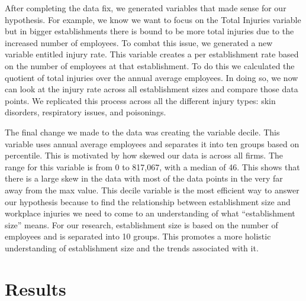 \documentclass[12pt]{article}
\begin{document}
After completing the data fix, we generated variables that made sense for our hypothesis. For example, we know we want to focus on the Total Injuries variable but in bigger establishments there is bound to be more total injuries due to the increased number of employees. To combat this issue, we generated a new variable entitled injury rate. This variable creates a per establishment rate based on the number of employees at that establishment. To do this we calculated the quotient of total injuries over the annual average employees. In doing so, we now can look at the injury rate across all establishment sizes and compare those data points. We replicated this process across all the different injury types: skin disorders, respiratory issues, and poisonings. 

The final change we made to the data was creating the variable decile. This variable uses annual average employees and separates it into ten groups based on percentile. This is motivated by how skewed our data is across all firms. The range for this variable is from 0 to 817,067, with a median of 46. This shows that there is a large skew in the data with most of the data points in the very far away from the max value. This decile variable is the most efficient way to answer our hypothesis because to find the relationship between establishment size and workplace injuries we need to come to an understanding of what “establishment size” means. For our research, establishment size is based on the number of employees and is separated into 10 groups. This promotes a more holistic understanding of establishment size and the trends associated with it.

\section{Results}
\label{sec:result}
\end{document}
